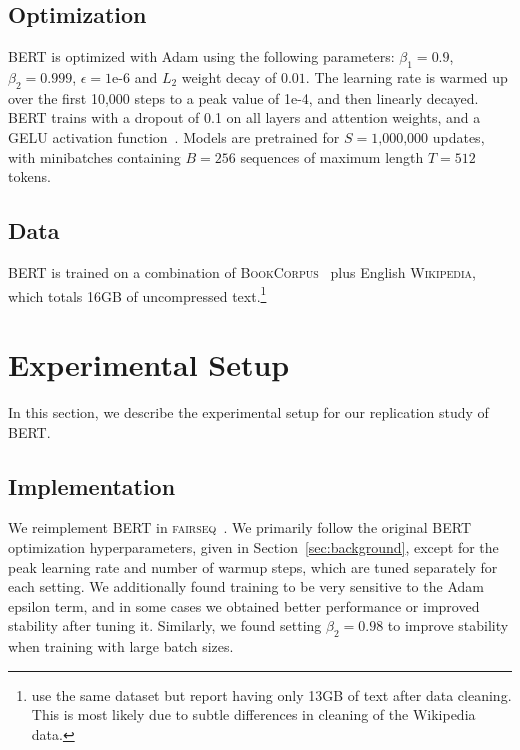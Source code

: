 \subsection{Optimization}

BERT is optimized with Adam \cite{kingma2014adam} using the following parameters: $\beta_1 = 0.9$, $\beta_2= 0.999$, $\epsilon = \text{1e-6}$ and $L_2$ weight decay of $0.01$. The learning rate is warmed up over the first 10,000 steps to a peak value of 1e-4, and then linearly decayed. BERT trains with a dropout of 0.1 on all layers and attention weights, and a GELU activation function~\cite{hendrycks2016gelu}. Models are pretrained for $S=\text{1,000,000}$ updates, with minibatches containing $B=\text{256}$ sequences of maximum length $T=\text{512}$ tokens.

\subsection{Data}

BERT is trained on a combination of \textsc{BookCorpus}~\cite{moviebook} plus English \textsc{Wikipedia}, which totals 16GB of uncompressed text.\footnote{ use the same dataset but report having only 13GB of text after data cleaning. This is most likely due to subtle differences in cleaning of the Wikipedia data.}

\section{Experimental Setup} \label{sec:exp}

In this section, we describe the experimental setup for our replication study of BERT.

\subsection{Implementation} \label{sec:implementation}

We reimplement BERT in \textsc{fairseq}~\cite{ott2019fairseq}.
We primarily follow the original BERT optimization hyperparameters, given in Section~\ref{sec:background}, except for the peak learning rate and number of warmup steps, which are tuned separately for each setting. We additionally found training to be very sensitive to the Adam epsilon term, and in some cases we obtained better performance or improved stability after tuning it. Similarly, we found setting $\beta_2 = 0.98$ to improve stability when training with large batch sizes.

